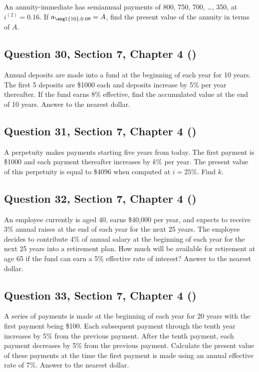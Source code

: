 \documentclass[12pt, a4paper]{article}
\begin{document}
\noindent An annuity-immediate has semiannual payments of 800, 750, 700, \dots, 350, at \( i^{(2)} = 0.16. \)  
If \( a_{\angl{10}, 0.08} = A \), find the present value of the annuity in terms of \( A. \)

\subsection*{Question 30, Section 7, Chapter 4  (\cite{toi3rd})}

\noindent Annual deposits are made into a fund at the beginning of each year for 10 years. The first 5 deposits are \$1000 each and deposits increase by 5\% per year thereafter.  If the fund earns 8\% effective, find the accumulated value at the end of 10 years. Answer to the nearest dollar.

\subsection*{Question 31, Section 7, Chapter 4  (\cite{toi3rd})}

\noindent A perpetuity makes payments starting five years from today. The first payment is \$1000 and each payment thereafter increases by \( k\% \) per year.  The present value of this perpetuity is equal to \$4096 when computed at \( i = 25\% \). Find \( k \).

\subsection*{Question 32, Section 7, Chapter 4  (\cite{toi3rd})}

\noindent An employee currently is aged 40, earns \$40{,}000 per year, and expects to receive 3\% annual raises at the end of each year for the next 25 years. The employee decides to contribute 4\% of annual salary at the beginning of each year for the next 25 years into a retirement plan. How much will be available for retirement at age 65 if the fund can earn a 5\% effective rate of interest? Answer to the nearest dollar.

\subsection*{Question 33, Section 7, Chapter 4  (\cite{toi3rd})}

\noindent A series of payments is made at the beginning of each year for 20 years with the first payment being \$100. Each subsequent payment through the tenth year increases by 5\% from the previous payment.  After the tenth payment, each payment decreases by 5\% from the previous payment. Calculate the present value of these payments at the time the first payment is made using an annual effective rate of 7\%.  Answer to the nearest dollar.
\end{document}
